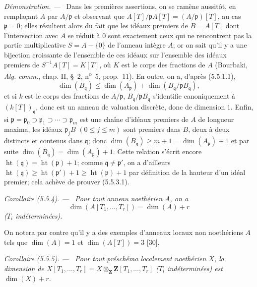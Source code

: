 \documentclass[10pt,oneside]{book}
\makeatletter
\newenvironment{corollary}[1][]{%
  \par\medskip\noindent\itshape Corollaire (#1). ---\ }{\par}
\newenvironment{proof}{%
  \par\medskip\noindent\textit{Démonstration. ---\ }}{\par}
\newcommand{\EGAReaderTarget}[2]{\hypertarget{#1}{}\@bsphack\begingroup\def\@currentHref{#1}\label{#2}\endgroup\@esphack}
\makeatother
\begin{document}
\begin{proof}
Dans les premières assertions, on se ramène aussitôt, en remplaçant $A$ par
$A/\mathfrak p$ et observant que
$A[T]/\mathfrak pA[T]=(A/\mathfrak p)[T]$, au cas $\mathfrak p=0$; elles
résultent alors du fait que les idéaux premiers de $B=A[T]$ dont
l'intersection avec $A$ se réduit à $0$ sont exactement ceux qui ne
rencontrent pas la partie multiplicative $S=A-\{0\}$ de l'anneau intègre
$A$; or on sait qu'il y a une bijection croissante de l'ensemble de ces
idéaux sur l'ensemble des idéaux premiers de $S^{-1}A[T]=K[T]$, où $K$ est
le corps des fractions de $A$ (Bourbaki, \emph{Alg. comm.}, chap. II,
\S~2, n\textsuperscript{o}~5, prop.~11). En outre, on a, d'après (5.5.1.1),
\[
\dim(B_{\mathfrak q})\leq\dim(A_{\mathfrak p})
+\dim(B_{\mathfrak q}/\mathfrak pB_{\mathfrak q}),
\]
et si $k$ est le corps des fractions de $A/\mathfrak p$,
$B_{\mathfrak q}/\mathfrak pB_{\mathfrak q}$ s'identifie canoniquement à
$(k[T])_{\mathfrak q}$, donc est un anneau de valuation discrète, donc de
dimension $1$. Enfin, si
$\mathfrak p=\mathfrak p_0\supset\mathfrak p_1\supset\cdots
\supset\mathfrak p_m$ est une chaîne d'idéaux premiers de $A$ de longueur
maxima, les idéaux $\mathfrak p_jB$ $(0\leq j\leq m)$ sont premiers dans
$B$, deux à deux distincts et contenus dans $\mathfrak q$; donc
$\dim(B_{\mathfrak q})\geq m+1=\dim(A_{\mathfrak p})+1$ et par suite
$\dim(B_{\mathfrak q})=\dim(A_{\mathfrak p})+1$. Cette relation s'écrit
encore $\operatorname{ht}(\mathfrak q)=\operatorname{ht}(\mathfrak p)+1$;
comme $\mathfrak q\ne\mathfrak p'$, on a d'ailleurs
$\operatorname{ht}(\mathfrak q)\geq\operatorname{ht}(\mathfrak p')+1
\geq\operatorname{ht}(\mathfrak p)+1$ par définition de la hauteur d'un
idéal premier; cela achève de prouver (5.5.3.1).
\end{proof}

\begin{corollary}[5.5.4]
\EGAReaderTarget{ega4.c04.cor.5-5-4}{IV.2.s5.5.4-fr}
Pour tout anneau noethérien $A$, on a
\begin{equation}
\dim(A[T_1,\ldots,T_r])=\dim(A)+r
\tag{5.5.4.1}\label{IV.2.s5.5.4.1-fr}
\end{equation}
($T_i$ indéterminées).
\end{corollary}

On notera par contre qu'il y a des exemples d'anneaux locaux non noethériens
$A$ tels que $\dim(A)=1$ et $\dim(A[T])=3$ [30].

\begin{corollary}[5.5.5]
\label{IV.2.s5.5.5-fr}
Pour tout préschéma localement noethérien $X$, la dimension de
$X[T_1,\ldots,T_r]=X\otimes_{\mathbf Z}\mathbf Z[T_1,\ldots,T_r]$
($T_i$ indéterminées) est $\dim(X)+r$.
\end{corollary}
\end{document}
